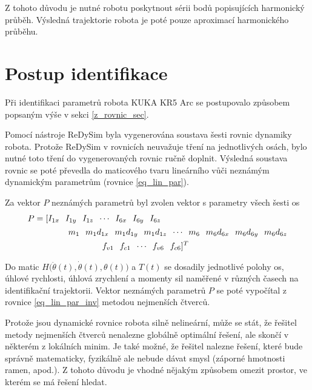 Z tohoto důvodu je nutné robotu poskytnout sérii bodů popisujících harmonický průběh. Výsledná trajektorie robota je poté pouze aproximací harmonického průběhu.  

\section{Postup identifikace}

Při identifikaci parametrů robota KUKA KR5 Arc se postupovalo způsobem popsaným výše v sekci \ref{z_rovnic_sec}. 

Pomocí nástroje ReDySim byla vygenerována soustava šesti rovnic dynamiky robota. Protože ReDySim v rovnicích neuvažuje tření na jednotlivých osách, bylo nutné toto tření do vygenerovaných rovnic ručně doplnit. Výsledná soustava rovnic se poté převedla do maticového tvaru lineárního vůči neznámým dynamickým parametrům (rovnice \ref{eq_lin_par}). 

Za vektor $P$ neznámých parametrů byl zvolen vektor s parametry všech šesti os
\[\addtolength{\arraycolsep}{-1.5pt}
\begin{split}
P &= 
[\begin{matrix} I_{1x} & I_{1y} & I_{1z} &\cdots &I_{6x} & I_{6y} & I_{6z} \end{matrix} \\
 &\qquad\qquad \begin{matrix}  m_1 & m_1d_{1x} & m_1d_{1y} & m_1d_{1z} &\cdots & m_6 & m_6d_{6x} & m_6d_{6y} & m_6d_{6z} \end{matrix} \\
 &\qquad\qquad\qquad\qquad \begin{matrix} f_{v1} & f_{c1} &\cdots & f_{v6} & f_{c6} \end{matrix}]^{T}
\end{split}
\]

Do matic $H\big(\ddot{\theta}(t),\dot{\theta}(t),\theta(t)\big)$ a $T(t)$ se dosadily jednotlivé polohy os, úhlové rychlosti, úhlová zrychlení a momenty sil naměřené v různých časech na identifikační trajektorii. Vektor neznámých parametrů $P$ se poté vypočítal z rovnice \ref{eq_lin_par_inv} metodou nejmenších čtverců. 

Protože jsou dynamické rovnice robota silně nelineární, může se stát, že řešitel metody nejmenších čtverců nenalezne globálně optimální řešení, ale skončí v některém z lokálních minim. Je také možné, že řešitel nalezne řešení, které bude správně matematicky, fyzikálně ale nebude dávat smysl (záporné hmotnosti ramen, apod.). Z tohoto důvodu je vhodné nějakým způsobem omezit prostor, ve kterém se má řešení hledat.

